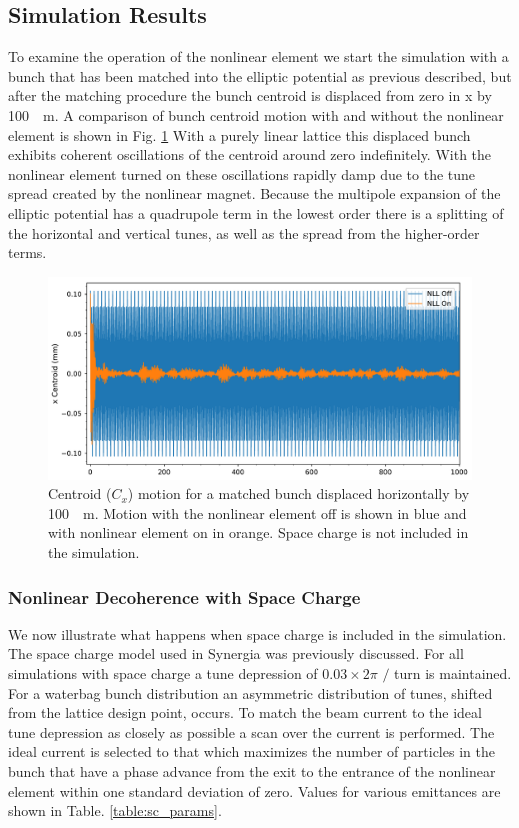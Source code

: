 \documentclass[aps,prstab,twocolumn, groupedaddress]{revtex4-1}
\begin{document}
\subsection{Simulation Results}
To examine the operation of the nonlinear element we start the simulation with a bunch 
that has been matched into the elliptic potential as previous described, but after the 
matching procedure the bunch centroid is displaced from zero in x by \SI{+100}{\mu m}. A 
comparison of bunch centroid motion with and without the nonlinear element is shown in 
Fig. \ref{fig:nll_on-off} With a purely linear lattice this displaced bunch exhibits coherent 
oscillations of the centroid around zero indefinitely. With the nonlinear element turned on 
these oscillations  rapidly damp due to the tune spread created by the nonlinear magnet. 
Because the multipole expansion of the elliptic potential has a 
quadrupole term in the lowest order there is a splitting of the horizontal and vertical 
tunes, as well as the spread from the higher-order terms. 
\begin{figure}
	\includegraphics[width=\columnwidth]{t_on-off_16um.pdf}%
	\caption{\label{fig:nll_on-off} Centroid ($C_x$) motion for a matched bunch displaced 
	horizontally by \SI{100}{\mu m}. Motion with the nonlinear element off is shown in blue 
	and with nonlinear element on in orange. Space charge is not included in the 
	simulation.}
\end{figure}

\subsubsection{Nonlinear Decoherence with Space Charge}

We now illustrate what happens when space charge is included in the simulation. The 
space charge model used in Synergia was previously discussed. For all simulations with 
space charge a tune depression of $0.03 \times 2\pi$ $/$ turn is maintained. For a 
waterbag bunch distribution an asymmetric distribution of tunes, shifted from the lattice 
design point, occurs. To match the beam current to the ideal tune depression as closely 
as possible a scan over the current is performed. The ideal current is selected to that 
which maximizes the number of particles in the bunch that have a phase advance from the 
exit to the entrance of the nonlinear element within one standard deviation of zero. Values 
for various emittances are shown in Table. \ref{table:sc_params}.
\end{document}
